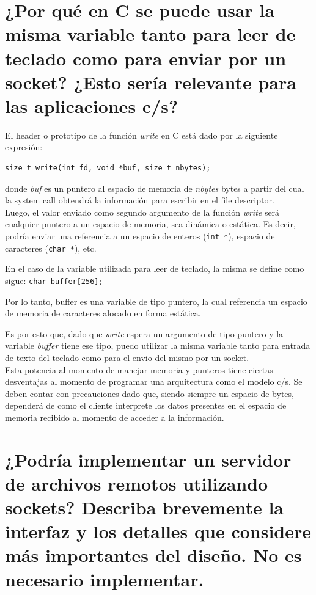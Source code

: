 \documentclass[osajnl,twocolumn,showpacs,superscriptaddress,10pt]{revtex4-1} %
\begin{document}
\section{¿Por qué en C se puede usar la misma variable tanto para leer de teclado como para enviar por un socket? ¿Esto sería relevante para las aplicaciones c/s?}

El header o prototipo de la función \textit{write} en C está dado por la siguiente expresión:

\begin{verbatim}
size_t write(int fd, void *buf, size_t nbytes);
\end{verbatim}

donde \textit{buf} es un puntero al espacio de memoria de \textit{nbytes} bytes a partir del cual la system call obtendrá la información para escribir en el file descriptor. \\

Luego, el valor enviado como segundo argumento de la función \textit{write} será cualquier puntero a un espacio de memoria, sea dinámica o estática. Es decir, podría enviar una referencia a un espacio de enteros (\texttt{int *}), espacio de caracteres (\texttt{char *}), etc.

En el caso de la variable utilizada para leer de teclado, la misma se define como sigue: \texttt{char buffer[256];}

Por lo tanto, buffer es una variable de tipo puntero, la cual referencia un espacio de memoria de caracteres alocado en forma estática.

Es por esto que, dado que \textit{write} espera un argumento de tipo puntero y la variable \textit{buffer} tiene ese tipo, puedo utilizar la misma variable tanto para entrada de texto del teclado como para el envio del mismo por un socket. \\

Esta potencia al momento de manejar memoria y punteros tiene ciertas desventajas al momento de programar una arquitectura como el modelo c/s. Se deben contar con precauciones dado que, siendo siempre un espacio de bytes, dependerá de como el cliente interprete los datos presentes en el espacio de memoria recibido al momento de acceder a la información.

\section{¿Podría implementar un servidor de archivos remotos utilizando sockets? Describa brevemente la interfaz y los detalles que considere más importantes del diseño. No es necesario implementar.}
\end{document}
